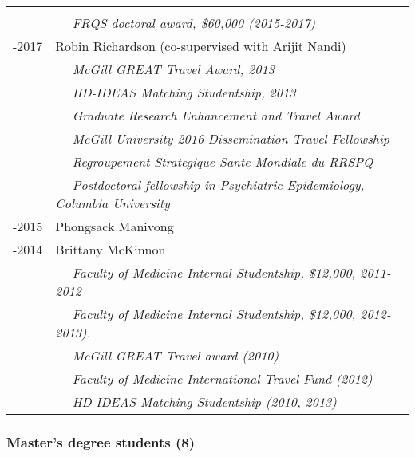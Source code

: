 \documentclass[
  letterpaper,
  DIV=11,
  numbers=noendperiod]{scrartcl}
\begin{document}
\begin{longtable}[]{@{}
  >{\raggedright\arraybackslash}p{}
  >{\raggedright\arraybackslash}p{}@{}}
{\$21,000} \\
& ~~ \emph{FRQS doctoral award, \$60,000 (2015-2017)} \\
2013-2017 & Robin Richardson (co-supervised with Arijit Nandi) \\
& ~~ \emph{McGill GREAT Travel Award, 2013} \\
& ~~ \emph{HD-IDEAS Matching Studentship, 2013} \\
& ~~ \emph{Graduate Research Enhancement and Travel Award} \\
& ~~ \emph{McGill University 2016 Dissemination Travel Fellowship } \\
& ~~ \emph{Regroupement Strategique Sante Mondiale du RRSPQ} \\
& ~~ \emph{Postdoctoral fellowship in Psychiatric Epidemiology, Columbia
University} \\
2011-2015 & Phongsack Manivong \\
2009-2014 & Brittany McKinnon \\
& ~~ \emph{Faculty of Medicine Internal Studentship, \$12,000,
2011-2012} \\
& ~~ \emph{Faculty of Medicine Internal Studentship, \$12,000,
2012-2013).} \\
& ~~ \emph{McGill GREAT Travel award (2010)} \\
& ~~ \emph{Faculty of Medicine International Travel Fund (2012)} \\
& ~~ \emph{HD-IDEAS Matching Studentship (2010, 2013)} \\
\end{longtable}

\subsubsection{Master's degree students
(8)}\label{masters-degree-students-8}
\end{document}
